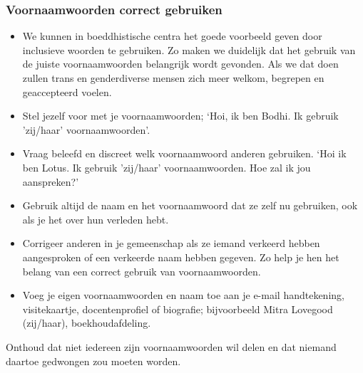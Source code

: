 \documentclass[12pt,openany]{book}
\begin{document}
\begin{figure}[h]
    \centering
\end{figure}

\subsubsection*{Voornaamwoorden correct gebruiken}

\begin{itemize}
\item We kunnen in boeddhistische centra het goede voorbeeld geven door inclusieve woorden te gebruiken. Zo maken we duidelijk dat het gebruik van de juiste voornaamwoorden belangrijk wordt gevonden. Als we dat doen zullen trans en genderdiverse mensen zich meer welkom, begrepen en geaccepteerd voelen.
\item Stel jezelf voor met je voornaamwoorden; ‘Hoi, ik ben Bodhi. Ik gebruik ’zij/haar’ voornaamwoorden’. 
\item Vraag beleefd en discreet welk voornaamwoord anderen gebruiken. ‘Hoi ik ben Lotus. Ik gebruik ’zij/haar’ voornaamwoorden. Hoe zal ik jou aanspreken?’ 
\item Gebruik altijd de naam en het voornaamwoord dat ze zelf nu gebruiken, ook als je het over hun verleden hebt.
\item Corrigeer anderen in je gemeenschap als ze iemand verkeerd hebben aangesproken of een verkeerde naam hebben gegeven. Zo help je hen het belang van een correct gebruik van voornaamwoorden.
\item Voeg je eigen voornaamwoorden en naam toe aan je e-mail handtekening, visitekaartje, docentenprofiel of biografie; bijvoorbeeld Mitra Lovegood (zij/haar), boekhoudafdeling.
\end{itemize}

Onthoud dat niet iedereen zijn voornaamwoorden wil delen en dat niemand daartoe gedwongen zou moeten worden. 

\begin{figure}[h]
    \centering
\end{figure}
\end{document}
